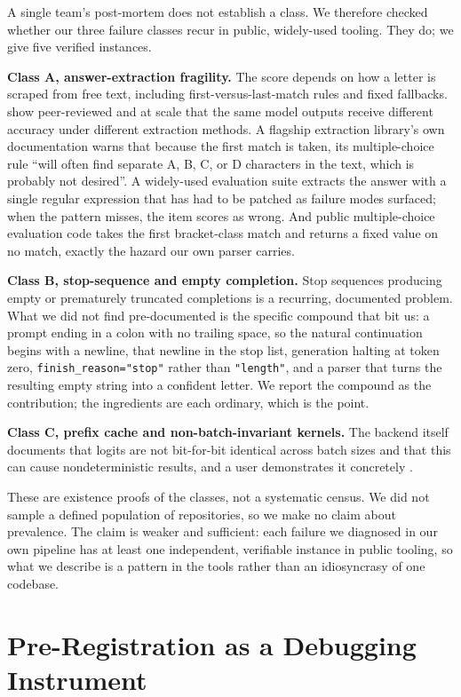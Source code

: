 \documentclass{article}
\begin{document}
A single team's post-mortem does not establish a class. We therefore checked whether our three failure classes recur in public, widely-used tooling. They do; we give five verified instances.

\textbf{Class A, answer-extraction fragility.} The score depends on how a letter is scraped from free text, including first-versus-last-match rules and fixed fallbacks.  show peer-reviewed and at scale that the same model outputs receive different accuracy under different extraction methods. A flagship extraction library's own documentation warns that because the first match is taken, its multiple-choice rule ``will often find separate A, B, C, or D characters in the text, which is probably not desired''. A widely-used evaluation suite extracts the answer with a single regular expression that has had to be patched as failure modes surfaced; when the pattern misses, the item scores as wrong. And public multiple-choice evaluation code takes the first bracket-class match and returns a fixed value on no match, exactly the hazard our own parser carries.

\textbf{Class B, stop-sequence and empty completion.} Stop sequences producing empty or prematurely truncated completions is a recurring, documented problem. What we did not find pre-documented is the specific compound that bit us: a prompt ending in a colon with no trailing space, so the natural continuation begins with a newline, that newline in the stop list, generation halting at token zero, \verb|finish_reason="stop"| rather than \verb|"length"|, and a parser that turns the resulting empty string into a confident letter. We report the compound as the contribution; the ingredients are each ordinary, which is the point.

\textbf{Class C, prefix cache and non-batch-invariant kernels.} The backend itself documents that logits are not bit-for-bit identical across batch sizes and that this can cause nondeterministic results, and a user demonstrates it concretely \cite{llamacpp_issue4479}.

These are existence proofs of the classes, not a systematic census. We did not sample a defined population of repositories, so we make no claim about prevalence. The claim is weaker and sufficient: each failure we diagnosed in our own pipeline has at least one independent, verifiable instance in public tooling, so what we describe is a pattern in the tools rather than an idiosyncrasy of one codebase.

\section{Pre-Registration as a Debugging Instrument}
\label{sec:prereg}
\end{document}
